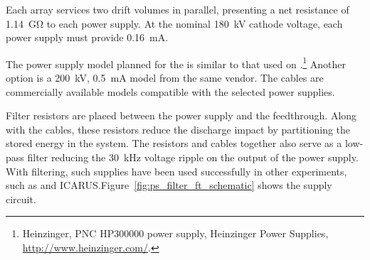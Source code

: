 Each  array 
services two drift volumes in parallel, 
presenting a net resistance of \SI{1.14}{\giga\ohm} to each power supply. At the nominal \SI{180}{kV} cathode voltage, each power supply must provide \SI{0.16}{mA}.

The power supply model planned for the  is similar to that used on .\footnote{Heinzinger, PNC HP300000  power supply, Heinzinger\texttrademark{} Power Supplies, \url{http://www.heinzinger.com/}.}  %
Another %
option is a \SI{200}{kV}, \SI{0.5}{mA} model from the same vendor. 
The  cables are commercially available models compatible with the selected power supplies. 


Filter resistors  are placed between the power supply and the feedthrough.  Along with the cables, these resistors reduce the discharge impact by partitioning the stored energy in the system.  The resistors and cables together also serve as a low-pass filter reducing 
the \SI{30}{kHz} voltage ripple on the output of the power supply.  With filtering, such supplies have been used successfully in other \lartpc experiments, such as \microboone and ICARUS.Figure~\ref{fig:ps_filter_ft_schematic} shows the  supply circuit.

